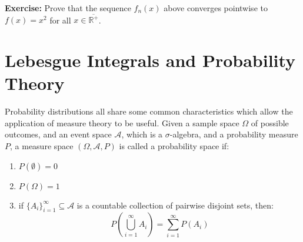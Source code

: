 \documentclass{article}
\begin{document}
\textbf{Exercise:} Prove that the sequence $f_n(x)$ above converges pointwise to $f(x)=x^2$ for all 
$x \in \overline{\mathbb{R}^{+}}$.


\section{Lebesgue Integrals and Probability Theory}

Probability distributions all share some common characteristics which allow the application of measure
theory to be useful. Given a sample space $\Omega$ of possible outcomes, and an event space 
$\mathcal{A}$, which is a $\sigma$-algebra, and a probability measure $P$, a measure space
$(\Omega, \mathcal{A}, P)$ is called a probability space if:
\begin{enumerate}
\item $P(\emptyset)=0$
\item $P(\Omega)=1$
\item if $\{A_{i}\}_{i=1}^{\infty } \subseteq {\mathcal{A}}$ is a countable collection of 
	pairwise disjoint sets, then:
		\[ P(\bigcup _{i=1}^{\infty }A_{i}) = \sum_{i=1}^{\infty} P(A_{i}) \]
\end{enumerate}
\end{document}
